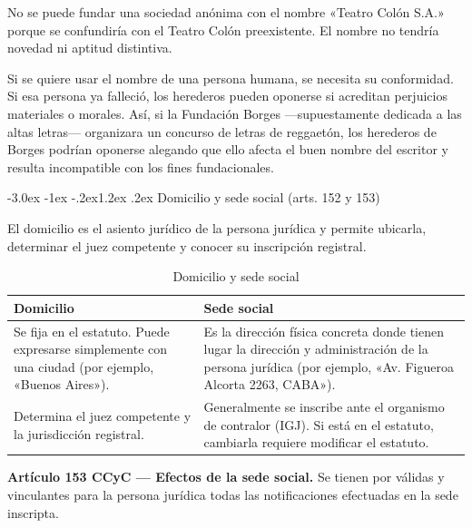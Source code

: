 \documentclass[12pt,oneside]{book}
\makeatletter
\renewcommand\section{\@startsection{section}{1}{\z@}%
  {-3.0ex \@plus -1ex \@minus -.2ex}{1.2ex \@plus .2ex}%
  {\normalfont\large\bfseries\color{acento}}}
\makeatother
\begin{document}
\begin{ejemplo}
No se puede fundar una sociedad anónima con el nombre «Teatro Colón S.A.» porque se confundiría con el Teatro Colón preexistente. El nombre no tendría novedad ni aptitud distintiva.
\end{ejemplo}

\begin{ejemplo}
Si se quiere usar el nombre de una persona humana, se necesita su conformidad. Si esa persona ya falleció, los herederos pueden oponerse si acreditan perjuicios materiales o morales. Así, si la Fundación Borges ---supuestamente dedicada a las altas letras--- organizara un concurso de letras de reggaetón, los herederos de Borges podrían oponerse alegando que ello afecta el buen nombre del escritor y resulta incompatible con los fines fundacionales.
\end{ejemplo}

\section{Domicilio y sede social (arts. 152 y 153)}

El domicilio es el asiento jurídico de la persona jurídica y permite ubicarla, determinar el juez competente y conocer su inscripción registral.

\begin{table}[H]
\centering
\caption{Domicilio y sede social}
\begin{tabularx}{\textwidth}{>{\raggedright\arraybackslash}X >{\raggedright\arraybackslash}X}
\toprule
\textbf{Domicilio} & \textbf{Sede social} \\
\midrule
Se fija en el estatuto. Puede expresarse simplemente con una ciudad (por ejemplo, «Buenos Aires»). & Es la dirección física concreta donde tienen lugar la dirección y administración de la persona jurídica (por ejemplo, «Av. Figueroa Alcorta 2263, CABA»). \\
Determina el juez competente y la jurisdicción registral. & Generalmente se inscribe ante el organismo de contralor (IGJ). Si está en el estatuto, cambiarla requiere modificar el estatuto. \\
\bottomrule
\end{tabularx}
\end{table}

\begin{importante}
\textbf{Artículo 153 CCyC --- Efectos de la sede social.} Se tienen por válidas y vinculantes para la persona jurídica todas las notificaciones efectuadas en la sede inscripta.
\end{importante}
\end{document}
